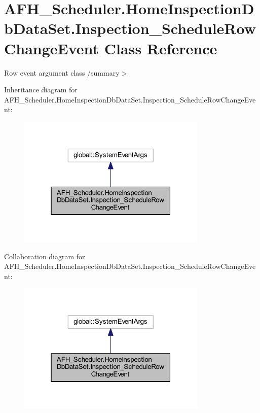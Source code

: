 \section{A\+F\+H\+\_\+\+Scheduler.\+Home\+Inspection\+Db\+Data\+Set.\+Inspection\+\_\+\+Schedule\+Row\+Change\+Event Class Reference}
\label{class_a_f_h___scheduler_1_1_home_inspection_db_data_set_1_1_inspection___schedule_row_change_event}


Row event argument class /summary$>$  




Inheritance diagram for A\+F\+H\+\_\+\+Scheduler.\+Home\+Inspection\+Db\+Data\+Set.\+Inspection\+\_\+\+Schedule\+Row\+Change\+Event\+:
\nopagebreak
\begin{figure}[H]
\begin{center}
\leavevmode
\includegraphics[width=256pt]{class_a_f_h___scheduler_1_1_home_inspection_db_data_set_1_1_inspection___schedule_row_change_event__inherit__graph}
\end{center}
\end{figure}


Collaboration diagram for A\+F\+H\+\_\+\+Scheduler.\+Home\+Inspection\+Db\+Data\+Set.\+Inspection\+\_\+\+Schedule\+Row\+Change\+Event\+:
\nopagebreak
\begin{figure}[H]
\begin{center}
\leavevmode
\includegraphics[width=256pt]{class_a_f_h___scheduler_1_1_home_inspection_db_data_set_1_1_inspection___schedule_row_change_event__coll__graph}
\end{center}
\end{figure}
